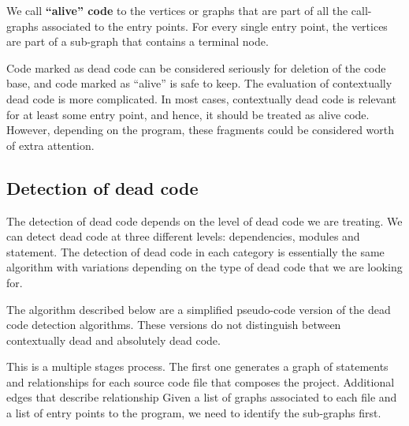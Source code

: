 \documentclass{uvamscse}
\begin{document}
 We call \textbf{``alive'' code} to the vertices or graphs that are part of all the call-graphs associated to the entry points. For every single entry point, the vertices are part of a sub-graph that contains a terminal node.
 
 Code marked as dead code can be considered seriously for deletion of the code base, and code marked as ``alive'' is safe to keep. The evaluation of contextually dead code is more complicated. In most cases, contextually dead code is relevant for at least some entry point, and hence, it should be treated as alive code. However, depending on the program, these fragments could be considered worth of extra attention. 
 
\subsection{Detection of dead code}
The detection of dead code depends on the level of dead code we are treating. We can detect dead code at three different levels: dependencies, modules and statement. The detection of dead code in each category is essentially the same algorithm with variations depending on the type of dead code that we are looking for.

The algorithm described below are a simplified pseudo-code version of the dead code detection algorithms. These versions do not distinguish between contextually dead and absolutely dead code. 
 
This is a multiple stages process. The first one generates a graph of statements and relationships for each source code file that composes the project. Additional edges that describe relationship
Given a list of graphs associated to each file and a list of entry points to the program, we need to identify the sub-graphs first.
\end{document}
